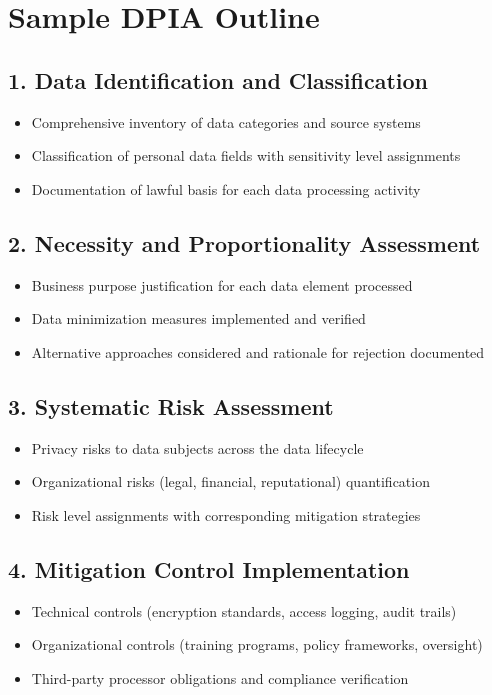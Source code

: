 \documentclass[12pt]{article}
\theoremstyle{plain}
\begin{document}
\section{Sample DPIA Outline}
\label{app:dpia}
\subsection*{1. Data Identification and Classification}
\begin{itemize}\itemsep0.2em
  \item Comprehensive inventory of data categories and source systems
  \item Classification of personal data fields with sensitivity level assignments
  \item Documentation of lawful basis for each data processing activity
\end{itemize}
\subsection*{2. Necessity and Proportionality Assessment}
\begin{itemize}\itemsep0.2em
  \item Business purpose justification for each data element processed
  \item Data minimization measures implemented and verified
  \item Alternative approaches considered and rationale for rejection documented
\end{itemize}
\subsection*{3. Systematic Risk Assessment}
\begin{itemize}\itemsep0.2em
  \item Privacy risks to data subjects across the data lifecycle
  \item Organizational risks (legal, financial, reputational) quantification
  \item Risk level assignments with corresponding mitigation strategies
\end{itemize}
\subsection*{4. Mitigation Control Implementation}
\begin{itemize}\itemsep0.2em
  \item Technical controls (encryption standards, access logging, audit trails)
  \item Organizational controls (training programs, policy frameworks, oversight)
  \item Third-party processor obligations and compliance verification
\end{itemize}
\end{document}
